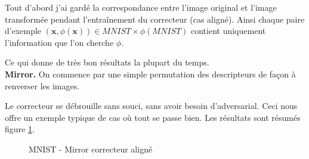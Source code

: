 Tout d'abord j'ai gardé la correspondance entre l'image original et
l'image transformée pendant l'entraînement du correcteur (cas aligné).
Ainsi chaque paire d'exemple $(\pmb{x}, \phi(\pmb{x})) \in MNIST\times \phi(MNIST)$
contient uniquement l'information que l'on cherche $\phi$.

Ce qui donne de très bon résultats la plupart du temps.\\


{\Large\textbf{Mirror.}} On commence par une simple permutation des 
descripteurs de façon à renverser les images.

Le correcteur se débrouille sans souci, sans avoir besoin d'adversarial. Ceci
nous offre un exemple typique de cas où tout se passe bien. Les résultats sont résumés
figure \ref{fig:mnist_mirror_pairwise}.

\begin{figure}[H] %
\centering
{}
\hfill
{}
\caption{MNIST - Mirror correcteur aligné}
\label{fig:mnist_mirror_pairwise}
\end{figure}



